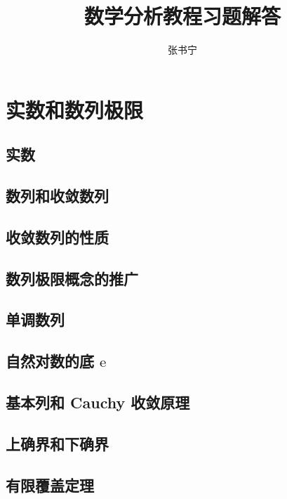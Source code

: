 \documentclass[a4paper, 12pt]{ctexbook}
\title{数学分析教程习题解答}
\author{张书宁}
\date{}
\begin{document}
    \maketitle

    \tableofcontents
    \mainmatter

    \chapter{实数和数列极限}
        \section{实数}
        \section{数列和收敛数列}
            
        \section{收敛数列的性质}
            
        \section{数列极限概念的推广}
            
        \section{单调数列}
            
        \section{自然对数的底 $\mathrm{e}$}
            
        \section{基本列和 Cauchy 收敛原理}
            
        \section{上确界和下确界}
            
        \section{有限覆盖定理}
\end{document}
